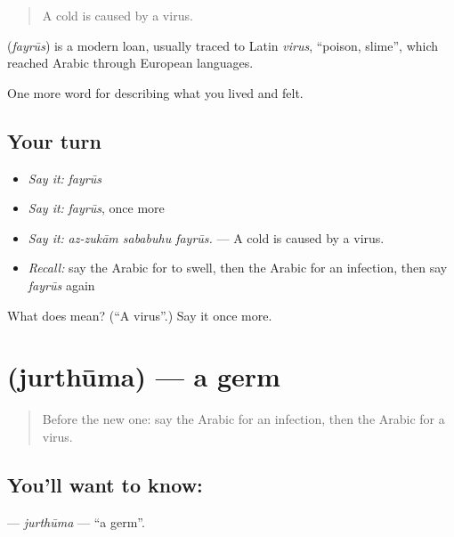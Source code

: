 \begin{quote}
A cold is caused by a virus.
\end{quote}

\begin{cousinweb}
\textbf{} (\emph{fayrūs}) is a modern loan, usually traced to Latin \emph{virus}, \textquotedblleft{}poison, slime\textquotedblright{}, which reached Arabic through European languages.
\end{cousinweb}

\begin{grammarlens}[title={What you've built}]
One more word for describing what you lived and felt.
\end{grammarlens}

\subsection*{Your turn}
\begin{itemize}
\raggedright
  \item \emph{Say it:} \emph{fayrūs}
  \item \emph{Say it:} \emph{fayrūs}, once more
  \item \emph{Say it:} \emph{az-zukām sababuhu fayrūs.} — A cold is caused by a virus.
  \item \emph{Recall:} say the Arabic for to swell, then the Arabic for an infection, then say \emph{fayrūs} again
\end{itemize}

\begin{tcolorbox}[breakable,colback=teal!4,colframe=teal!35!black,title={Before you move on}]
What does  mean? (\textquotedblleft{}A virus\textquotedblright{}.) Say it once more.
\end{tcolorbox}
\section[\texorpdfstring{\ar{جرثومة} (jurthūma)}{جرثومة (jurthūma)}]{ (jurthūma) — a germ}

\label{lesson:AR-C509-jurthuma}



\begin{quote}
Before the new one: say the Arabic for an infection, then the Arabic for a virus.
\end{quote}

\subsection*{You'll want to know: }
\textbf{} — \emph{jurthūma} — \textquotedblleft{}a germ\textquotedblright{}.

